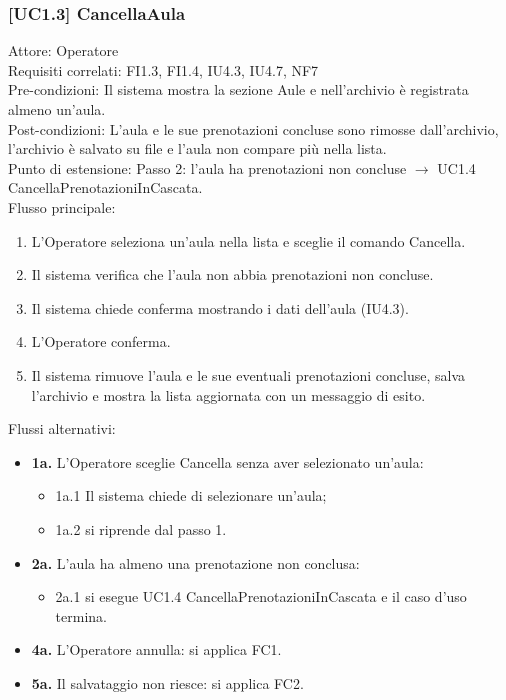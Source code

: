 \subsubsection{[UC1.3] CancellaAula}
\noindent Attore: Operatore\\
Requisiti correlati: FI1.3, FI1.4, IU4.3, IU4.7, NF7\\
Pre-condizioni: Il sistema mostra la sezione Aule e nell'archivio è registrata almeno un'aula.\\
Post-condizioni: L'aula e le sue prenotazioni concluse sono rimosse dall'archivio, l'archivio è salvato su file e l'aula non compare più nella lista.\\
Punto di estensione: Passo 2: l'aula ha prenotazioni non concluse $\rightarrow$ UC1.4 CancellaPrenotazioniInCascata.\\

\noindent Flusso principale:
\begin{enumerate}
\item L'Operatore seleziona un'aula nella lista e sceglie il comando Cancella.
\item Il sistema verifica che l'aula non abbia prenotazioni non concluse.
\item Il sistema chiede conferma mostrando i dati dell'aula (IU4.3).
\item L'Operatore conferma.
\item Il sistema rimuove l'aula e le sue eventuali prenotazioni concluse, salva l'archivio e mostra la lista aggiornata con un messaggio di esito.
\end{enumerate}
\noindent Flussi alternativi:
\begin{itemize}
\item \textbf{1a.} L'Operatore sceglie Cancella senza aver selezionato un'aula:
\begin{itemize}
\item 1a.1 Il sistema chiede di selezionare un'aula;
\item 1a.2 si riprende dal passo 1.
\end{itemize}
\item \textbf{2a.} L'aula ha almeno una prenotazione non conclusa:
\begin{itemize}
\item 2a.1 si esegue UC1.4 CancellaPrenotazioniInCascata e il caso d'uso termina.
\end{itemize}
\item \textbf{4a.} L'Operatore annulla: si applica FC1.
\item \textbf{5a.} Il salvataggio non riesce: si applica FC2.
\end{itemize}

